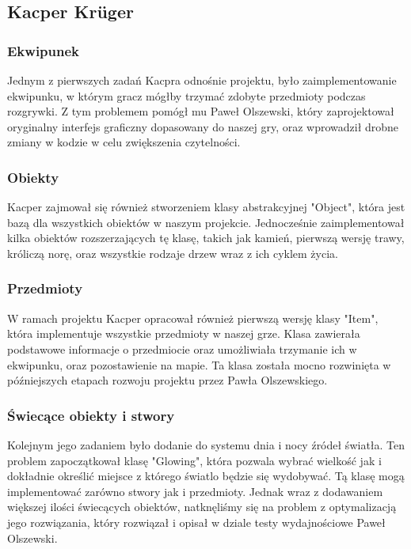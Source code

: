 \documentclass{article}
\begin{document}

\subsection{Kacper Krüger}
\subsubsection{Ekwipunek}
Jednym z pierwszych zadań Kacpra odnośnie projektu, było zaimplementowanie ekwipunku, w którym gracz mógłby trzymać zdobyte przedmioty podczas rozgrywki. Z tym problemem pomógł mu Paweł Olszewski, który zaprojektował oryginalny interfejs graficzny dopasowany do naszej gry, oraz wprowadził drobne zmiany w kodzie w celu zwiększenia czytelności.
\subsubsection{Obiekty}
Kacper zajmował się również stworzeniem klasy abstrakcyjnej "Object", która jest bazą dla wszystkich obiektów w naszym projekcie. Jednocześnie zaimplementował kilka obiektów rozszerzających tę klasę, takich jak kamień, pierwszą wersję trawy, króliczą norę, oraz wszystkie rodzaje drzew wraz z ich cyklem życia.
\subsubsection{Przedmioty}
W ramach projektu Kacper opracował również pierwszą wersję klasy "Item", która implementuje wszystkie przedmioty w naszej grze. Klasa zawierała podstawowe informacje o przedmiocie oraz umożliwiała trzymanie ich w ekwipunku, oraz pozostawienie na mapie. Ta klasa została mocno rozwinięta w późniejszych etapach rozwoju projektu przez Pawła Olszewskiego.
\subsubsection{Świecące obiekty i stwory}
Kolejnym jego zadaniem było dodanie do systemu dnia i nocy źródeł światła. Ten problem zapoczątkował klasę "Glowing", która pozwala wybrać wielkość jak i dokładnie określić miejsce z którego światlo będzie się wydobywać. Tą klasę mogą implementować zarówno stwory jak i przedmioty. Jednak wraz z dodawaniem większej ilości świecących obiektów, natknęliśmy się na problem z optymalizacją jego rozwiązania, który rozwiązał i opisał w dziale testy wydajnościowe Paweł Olszewski. 
\end{document}
